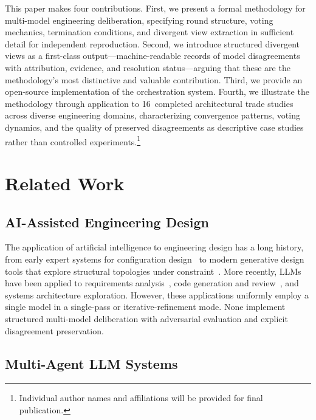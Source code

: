 \documentclass[11pt,a4paper]{article}
\begin{document}
This paper makes four contributions. First, we present a formal methodology for multi-model engineering deliberation, specifying round structure, voting mechanics, termination conditions, and divergent view extraction in sufficient detail for independent reproduction. Second, we introduce structured divergent views as a first-class output---machine-readable records of model disagreements with attribution, evidence, and resolution status---arguing that these are the methodology's most distinctive and valuable contribution. Third, we provide an open-source implementation of the orchestration system. Fourth, we illustrate the methodology through application to 16~completed architectural trade studies across diverse engineering domains, characterizing convergence patterns, voting dynamics, and the quality of preserved disagreements as descriptive case studies rather than controlled experiments.\footnote{Individual author names and affiliations will be provided for final publication.}

\section{Related Work}
\label{sec:related}

\subsection{AI-Assisted Engineering Design}

The application of artificial intelligence to engineering design has a long history, from early expert systems for configuration design~\cite{mcdermott1982r1} to modern generative design tools that explore structural topologies under constraint~\cite{autodesk2023generative}. More recently, LLMs have been applied to requirements analysis~\cite{arulmohan2023extracting}, code generation and review~\cite{chen2021codex}, and systems architecture exploration. However, these applications uniformly employ a single model in a single-pass or iterative-refinement mode. None implement structured multi-model deliberation with adversarial evaluation and explicit disagreement preservation.

\subsection{Multi-Agent LLM Systems}
\end{document}
